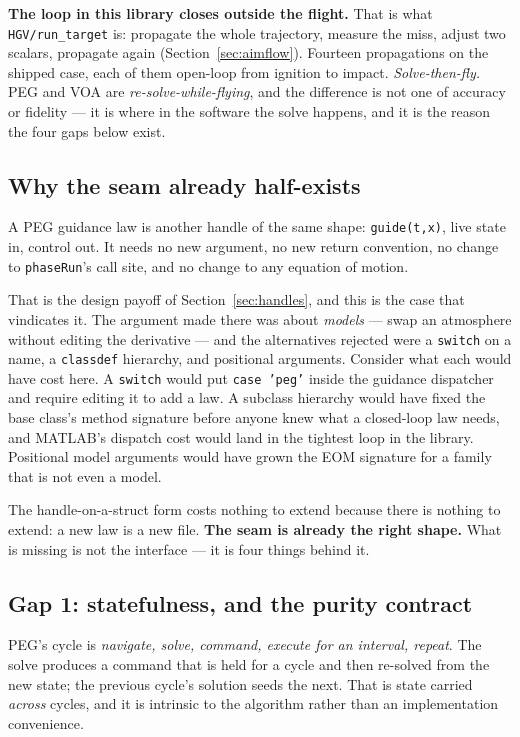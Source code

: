 \documentclass[11pt]{article}
\newcommand{\code}[1]{\texttt{#1}}
\begin{document}
\textbf{The loop in this library closes outside the flight.} That is what
\code{HGV/run\_target} is: propagate the whole trajectory, measure the miss,
adjust two scalars, propagate again (Section~\ref{sec:aimflow}). Fourteen
propagations on the shipped case, each of them open-loop from ignition to
impact. \emph{Solve-then-fly.} PEG and VOA are \emph{re-solve-while-flying},
and the difference is not one of accuracy or fidelity --- it is where in the
software the solve happens, and it is the reason the four gaps below exist.

\subsection{Why the seam already half-exists}

A PEG guidance law is another handle of the same shape: \code{guide(t,x)}, live
state in, control out. It needs no new argument, no new return convention, no
change to \code{phaseRun}'s call site, and no change to any equation of motion.

That is the design payoff of Section~\ref{sec:handles}, and this is the case
that vindicates it. The argument made there was about \emph{models} --- swap an
atmosphere without editing the derivative --- and the alternatives rejected
were a \code{switch} on a name, a \code{classdef} hierarchy, and positional
arguments. Consider what each would have cost here. A \code{switch} would put
\code{case 'peg'} inside the guidance dispatcher and require editing it to add
a law. A subclass hierarchy would have fixed the base class's method signature
before anyone knew what a closed-loop law needs, and MATLAB's dispatch cost
would land in the tightest loop in the library. Positional model arguments
would have grown the EOM signature for a family that is not even a model.

The handle-on-a-struct form costs nothing to extend because there is nothing to
extend: a new law is a new file. \textbf{The seam is already the right shape.}
What is missing is not the interface --- it is four things behind it.

\subsection{Gap 1: statefulness, and the purity contract}

PEG's cycle is \emph{navigate, solve, command, execute for an interval,
repeat}. The solve produces a command that is held for a cycle and then
re-solved from the new state; the previous cycle's solution seeds the next.
That is state carried \emph{across} cycles, and it is intrinsic to the
algorithm rather than an implementation convenience.
\end{document}
